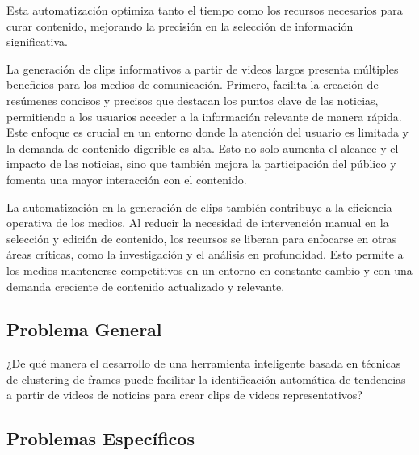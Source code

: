 Esta automatización optimiza tanto el tiempo como los recursos necesarios para curar contenido, mejorando la precisión en la selección de información significativa.

La generación de clips informativos a partir de videos largos presenta múltiples beneficios para los medios de comunicación. Primero, facilita la creación de resúmenes concisos y precisos que destacan los puntos clave de las noticias, permitiendo a los usuarios acceder a la información relevante de manera rápida. Este enfoque es crucial en un entorno donde la atención del usuario es limitada y la demanda de contenido digerible es alta.
Esto no solo aumenta el alcance y el impacto de las noticias, sino que también mejora la participación del público y fomenta una mayor interacción con el contenido.

La automatización en la generación de clips también contribuye a la eficiencia operativa de los medios. Al reducir la necesidad de intervención manual en la selección y edición de contenido, los recursos se liberan para enfocarse en otras áreas críticas, como la investigación y el análisis en profundidad. Esto permite a los medios mantenerse competitivos en un entorno en constante cambio y con una demanda creciente de contenido actualizado y relevante.


\subsection{Problema General}
\newcommand{\ProblemaGeneral}{
	¿De qué manera el desarrollo de una herramienta inteligente basada en técnicas de clustering de frames puede facilitar la identificación automática de tendencias a partir de videos de noticias para crear clips de videos representativos?}
\ProblemaGeneral
\subsection{Problemas Espec\'{i}ficos}
\newcommand{\Pbone}{¿Cómo obtener de manera eficiente los videos de noticias referentes a un día en específico, asegurando que sean representativos de los eventos más importantes del día?}
\newcommand{\Pbtwo}{¿Qué técnicas de preprocesamiento de imágenes y normalización son más efectivas para mejorar la calidad y relevancia de los frames extraídos de los videos?}
\newcommand{\Pbthree}{¿Qué técnicas de extracción de características permiten representar adecuadamente los frames para identificar patrones visuales relevantes?}
\newcommand{\Pbfour}{¿Cuál es el algoritmo de clustering más adecuado para agrupar los frames en base a las similitudes de las características extraídas que posean entre ellas?}
\newcommand{\Pbfive}{¿Cómo generar clips informativos concisos, asegurando que reflejen los eventos clave discutidos en las noticias?}

